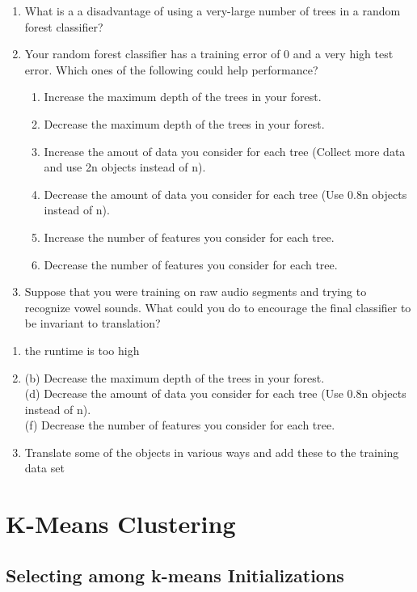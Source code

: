\documentclass{article}
\def\blu#1{{\color{blu}#1}}
\def\enum#1{\begin{enumerate}#1\end{enumerate}}
\begin{document}
\blu{\enum{
\item What is a a disadvantage of using a very-large number of trees in a random forest classifier?
\item Your random forest classifier has a training error of 0 and a very high test error. Which ones of the following could help performance?
\enum{
\item Increase the maximum depth of the trees in your forest.
\item Decrease the maximum depth of the trees in your forest.
\item Increase the amout of data you consider for each tree (Collect more data and use 2n objects instead of n).
\item Decrease the amount of data you consider for each tree (Use 0.8n objects instead of n).
\item Increase the number of features you consider for each tree.
\item Decrease the number of features you consider for each tree.
}
\item Suppose that you were training on raw audio segments and trying to recognize vowel sounds. What could you do to encourage the final classifier to be invariant to translation?
}
}


\begin{enumerate}
\item the runtime is too high
\item %
    (b) Decrease the maximum depth of the trees in your forest.\\
    (d) Decrease the amount of data you consider for each tree (Use 0.8n objects instead of n).\\
    (f) Decrease the number of features you consider for each tree.\\
\item Translate some of the objects in various ways and add these to the training data set
 
\end{enumerate}


\section{K-Means Clustering}

\subsection{Selecting among k-means Initializations}
 
\end{document}

